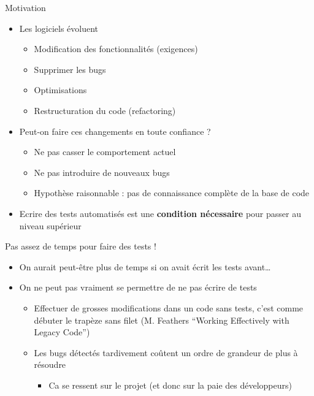 \begin{frame}{Motivation}

\begin{itemize}
\itemsep1pt\parskip0pt
\item
  Les logiciels évoluent

  \begin{itemize}
  \itemsep1pt\parskip0pt
  \item
    Modification des fonctionnalités (exigences)
  \item
    Supprimer les bugs
  \item
    Optimisations
  \item
    Restructuration du code (refactoring)
  \end{itemize}
\item
  Peut-on faire ces changements en toute confiance ?

  \begin{itemize}
  \itemsep1pt\parskip0pt
  \item
    Ne pas casser le comportement actuel
  \item
    Ne pas introduire de nouveaux bugs
  \item
    Hypothèse raisonnable : pas de connaissance complète de la base de
    code
  \end{itemize}
\item
  Ecrire des tests automatisés est une \textbf{condition nécessaire}
  pour passer au niveau supérieur
\end{itemize}

\end{frame}

\begin{frame}{Pas assez de temps pour faire des tests !}

\begin{itemize}
\itemsep1pt\parskip0pt
\item
  On aurait peut-être plus de temps si on avait écrit les tests
  avant\ldots{}
\item
  On ne peut pas vraiment se permettre de ne pas écrire de tests

  \begin{itemize}
  \itemsep1pt\parskip0pt
  \item
    Effectuer de grosses modifications dans un code sans tests, c'est
    comme débuter le trapèze sans filet (M. Feathers ``Working
    Effectively with Legacy Code'')
  \item
    Les bugs détectés tardivement coûtent
    un ordre de grandeur de plus à résoudre

    \begin{itemize}
    \itemsep1pt\parskip0pt
    \item
      Ca se ressent sur le projet (et donc sur la paie des développeurs)
    \end{itemize}
  \end{itemize}
\end{itemize}

\end{frame}

